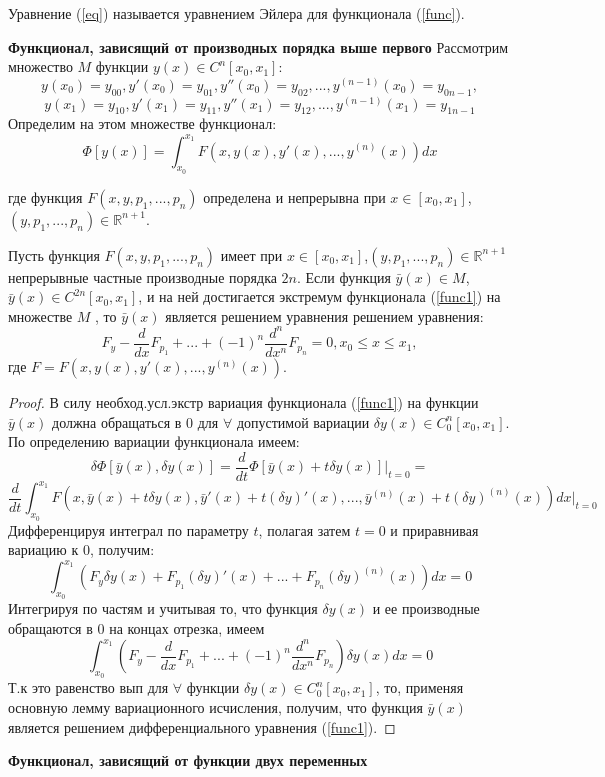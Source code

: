 Уравнение (\ref{eq}) называется уравнением Эйлера для функционала (\ref{func}).

\textbf{Функционал, зависящий от производных порядка выше
первого}
Рассмотрим множество $M$ функции $y(x) \in C^n[x_0, x_1]:$
$$y(x_0) = y_{00} , y'(x_0) = y_{01}, y''(x_0) = y_{02},..., y^{(n-1)}(x_0) = y_{0n-1},$$
$$y(x_1) = y_{10} , y'(x_1) = y_{11}, y''(x_1) = y_{12},..., y^{(n-1)}(x_1) = y_{1n-1}$$
Определим на этом множестве функционал:
\begin{equation}
    \Phi[y(x)]=\int_{x_0}^{x_1}F(x,y(x),y'(x),...,y^{(n)}(x))dx
    \label{func1}
\end{equation}

где функция $F(x,y,p_1,...,p_n)$ определена и непрерывна при $x \in [x_0, x_1]$,
$(y,p_1,..., p_n) \in \mathbb{R}^{n+1}$.
\begin{theorem}
    Пусть функция $F(x,y,p_1,...,p_n)$ имеет при $x\in[x_0, x_1]$,$(y,p_1,..., p_n) \in \mathbb{R}^{n+1}$ непрерывные частные производные порядка $2n$. Если функция $\bar y(x) \in M$, $\bar y(x) \in C^{2n}[x_0, x_1]$, и на ней достигается экстремум функционала (\ref{func1}) на множестве $M$ , то $\bar y(x)$ является решением уравнения
    решением уравнения:
    $$F_y-\frac{d}{dx}F_{p_1}+...+(-1)^n\frac{d^n}{dx^n}F_{p_n}=0, x_0 \leq x \leq x_1,$$
    где $F = F(x,y(x),y'(x),..., y^{(n)}(x))$.
\end{theorem}
\begin{proof}
    В силу необход.усл.экстр вариация
    функционала (\ref{func1}) на функции $\bar y(x)$ должна обращаться в 0 для
    $\forall$ допустимой вариации $\delta y(x) \in C^n_0[x_0, x_1]$.
    По определению вариации функционала имеем:
    $$\delta\Phi[\bar y(x), \delta y(x)]=\frac{d}{dt}\Phi[\bar y(x)+t\delta y(x)]\Big|_{t=0}=$$
    $$\frac{d}{dt}\int_{x_0}^{x_1}F(x,\bar y(x) + t\delta y(x), \bar y'(x)+t(\delta y)'(x),...,\bar y^{(n)}(x)+t(\delta y)^{(n)}(x))dx\Big|_{t=0}$$
    Дифференцируя интеграл по параметру $t$, полагая затем $t = 0$ и приравнивая вариацию к 0, получим:
    $$\int_{x_0}^{x_1}(F_y\delta y(x) + F_{p_1}(\delta y)'(x)+...+F_{p_n}(\delta y)^{(n)}(x))dx=0$$
    Интегрируя по частям и учитывая то, что функция $\delta y(x)$ и ее производные обращаются в 0 на концах отрезка, имеем
    $$\int_{x_0}^{x_1} (F_y-\frac{d}{dx}F_{p_1}+...+(-1)^n\frac{d^n}{dx^n}F_{p_n})\delta y(x) dx=0$$
    Т.к это равенство вып для $\forall$ функции $\delta y(x) \in C^n_0[x_0, x_1]$,
    то, применяя основную лемму вариационного исчисления, получим, что
    функция $\bar y(x)$ является решением дифференциального уравнения (\ref{func1}).
\end{proof}
\textbf{Функционал, зависящий от функции двух переменных}

